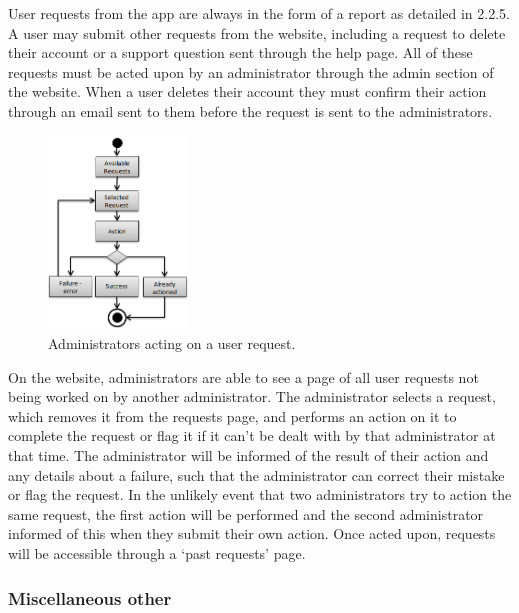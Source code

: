 User requests from the app are always in the form of a report as detailed in 2.2.5. A user may submit other requests from the website, including a request to delete their account or a support question sent through the help page. All of these requests must be acted upon by an administrator through the admin section of the website. When a user deletes their account they must confirm their action through an email sent to them before the request is sent to the administrators.

\newpage
\begin{figure}
	\vspace{-20pt}
	\begin{center}
	\includegraphics[width=0.33\textwidth]{images/admins_acting}
	\caption{Administrators acting on a user request.}
	\label{admins_acting}
	\end{center}
	\vspace{-20pt}
\end{figure}

On the website, administrators are able to see a page of all user requests not being worked on by another administrator. The administrator selects a request, which removes it from the requests page, and performs an action on it to complete the request or flag it if it can't be dealt with by that administrator at that time. The administrator will be informed of the result of their action and any details about a failure, such that the administrator can correct their mistake or flag the request. In the unlikely event that two administrators try to action the same request, the first action will be performed and the second administrator informed of this when they submit their own action. Once acted upon, requests will be accessible through a `past requests' page.

\subsubsection{Miscellaneous other}

